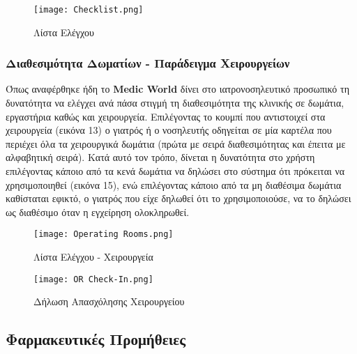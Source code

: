 \documentclass{article}
\begin{document}
\vspace{0.3cm}

\begin{figure}[!htb]
\centering
\texttt{[image: Checklist.png]}
\caption{\label{fig:checklist} Λίστα Ελέγχου}
\end{figure}

\subsubsection{Διαθεσιμότητα Δωματίων - Παράδειγμα Χειρουργείων}
Όπως αναφέρθηκε ήδη το \textbf{Medic World} δίνει στο ιατρονοσηλευτικό προσωπικό τη δυνατότητα να ελέγχει ανά πάσα στιγμή τη διαθεσιμότητα της κλινικής σε δωμάτια, εργαστήρια καθώς και χειρουργεία. 
Eπιλέγοντας το κουμπί που αντιστοιχεί στα χειρουργεία (εικόνα 13) ο γιατρός ή ο νοσηλευτής οδηγείται σε μία καρτέλα που περιέχει όλα τα χειρουργικά δωμάτια (πρώτα με σειρά διαθεσιμότητας και έπειτα με αλφαβητική σειρά). Κατά αυτό τον τρόπο, δίνεται η δυνατότητα στο χρήστη επιλέγοντας κάποιο από τα κενά δωμάτια να δηλώσει στο σύστημα ότι πρόκειται να χρησιμοποιηθεί (εικόνα 15), ενώ επιλέγοντας κάποιο από τα μη διαθέσιμα δωμάτια καθίσταται εφικτό, ο γιατρός που είχε δηλωθεί ότι το χρησιμοποιούσε, να το δηλώσει ως διαθέσιμο όταν η εγχείρηση ολοκληρωθεί.

\vspace{0.3cm}

\begin{figure}[!htb]
\centering
\texttt{[image: Operating Rooms.png]}
\caption{\label{fig:operating rooms} Λίστα Ελέγχου - Χειρουργεία}
\end{figure}

\vspace{0.3cm}

\begin{figure}[!htb]
\centering
\texttt{[image: OR Check-In.png]}
\caption{\label{fig:OR availability} Δήλωση Απασχόλησης Χειρουργείου}
\end{figure}

\subsection{Φαρμακευτικές Προμήθειες}
\end{document}
